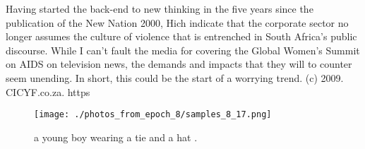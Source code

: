 \documentclass{article}%
\begin{document}
Having started the back{-}end to new thinking in the five years since the publication of the New Nation 2000, Hich indicate that the corporate sector no longer assumes the culture of violence that is entrenched in South Africa’s public discourse. While I can’t fault the media for covering the Global Women’s Summit on AIDS on television news, the demands and impacts that they will to counter seem unending.\newline%
In short, this could be the start of a worrying trend.\newline%
(c) 2009. CICYF.co.za. https

%


\begin{figure}[h!]%
\centering%
\texttt{[image: ./photos\_from\_epoch\_8/samples\_8\_17.png]}%
\caption{a young boy wearing a tie and a hat .}%
\end{figure}

%
\end{document}
